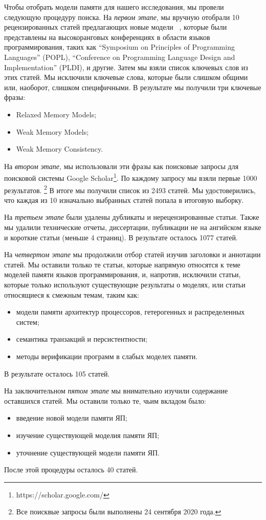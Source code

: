 Чтобы отобрать модели памяти для нашего исследования, 
мы провели следующую процедуру поиска. 
На \emph{первом этапе}, мы вручную отобрали 10 рецензированных статей 
предлагающих новые модели~%
\cite{
Manson-al:POPL05,
Batty-al:POPL11,
Lahav-al:PLDI17,
Dolan-al:PLDI18,
Watt-al:PLDI2020,
Jeffrey-Riely:LICS16,
PichonPharabod-Sewell:POPL16,
Kang-al:POPL17,
Chakraborty-Vafeiadis:POPL19,
Paviotti-al:ESOP20
},
которые были представлены на высокоранговых конференциях
в области языков программирования, таких как
``Symposium on Principles of Programming Languages'' (POPL),
``Conference on Programming Language Design and Implementation'' (PLDI), 
и другие. Затем мы взяли список ключевых слов из этих статей. 
Мы исключили ключевые слова, которые были слишком общими
или, наоборот, слишком специфичными. 
В результате мы получили три ключевые фразы:
\begin{itemize}
  \item Relaxed Memory Models;
  \item Weak Memory Models;
  \item Weak Memory Consistency.
\end{itemize}
 
На \emph{втором этапе}, мы использовали эти фразы как 
поисковые запросы для поисковой системы Google Scholar\footnote{https://scholar.google.com/}.
По каждому запросу мы взяли первые 1000 результатов.%
\footnote{Все поисквые запросы были выполнены 24 сентября 2020 года.}
В итоге мы получили список из 2493 статей. 
Мы удостоверились, что каждая из 10 изначально выбранных статей 
попала в итоговую выборку. 

На \emph{третьем этапе} были удалены дубликаты и нерецензированные статьи. 
Также мы удалили технические отчеты, диссертации, 
публикации не на ангийском языке и короткие статьи (меньше 4 страниц). 
В результате осталось 1077 статей. 

На \emph{четвертом этапе} мы продолжили отбор статей изучив 
заголовки и аннотации статей. 
Мы оставили только те статьи, которые напрямую относятся 
к теме моделей памяти языков программирования, 
и, напротив, исключили статьи, которые только используют 
существующие результаты о моделях, или статьи относящиеся 
к смежным темам, таким как:
\begin{itemize}
  \item модели памяти архитектур процессоров, гетерогенных и распределенных систем;
  \item семантика транзакций и персистентности;
  \item методы верификации программ в слабых моделех памяти.
\end{itemize}
В результате осталось 105 статей.

На заключительном \emph{пятом этапе} мы внимательно изучили содержание оставшихся статей. 
Мы оставили только те, чьим вкладом было:
\begin{itemize}
  \item введение новой модели памяти ЯП;
  \item изучение существующей моделия памяти ЯП;
  \item уточнение существующей модели памяти ЯП.
\end{itemize}
После этой процедуры осталось 40 статей.

